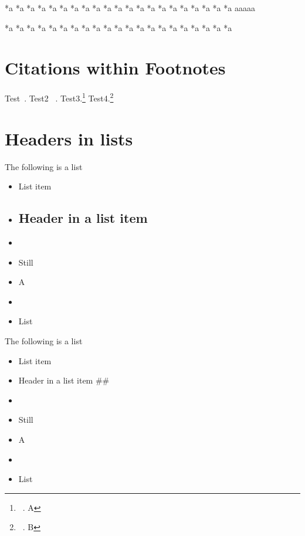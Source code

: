 *a
*a
*a
*a
*a
*a
*a
*a
*a
*a
*a
*a
*a
*a
*a
*a
*a
*a
*a
*a
*a
aaaaa

*a *a *a *a *a *a *a *a *a *a *a *a *a *a *a *a *a *a *a *a *a 

\part{Citations within Footnotes}
\label{citationswithinfootnotes}

Test~\citep{Citekey;}. Test2 ~\citep{Citekey;}. Test3.\footnote{~\citep{Citekey;}. A} Test4.\footnote{~\citep{Citekey;}. B}

\part{Headers in lists}
\label{headersinlists}

The following is a list

\begin{itemize}
\item List item

\item \chapter{Header in a list item}
\label{headerinalistitem}

\item 

\item Still

\item A 

\item 

\item List

\end{itemize}

The following is a list

\begin{itemize}
\item List item

\item Header in a list item \#\#

\item 

\item Still

\item A 

\item 

\item List

\end{itemize}

